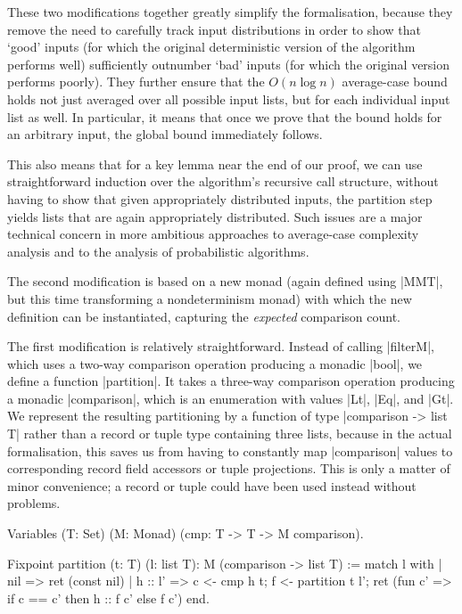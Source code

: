 \documentclass[runningheads]{llncs}
\begin{document}
These two modifications together greatly simplify the formalisation, because
they remove the need to carefully track input distributions in order to show
that `good' inputs (for which the original deterministic version of the
algorithm performs well) sufficiently outnumber `bad' inputs (for which the
original version performs poorly). They further ensure that the $O(n \log n)$
average-case bound holds not just averaged over all possible input lists, but
for each individual input list as well. In particular, it means that once we
prove that the bound holds for an arbitrary input, the global bound
immediately follows.

This also means that for a key lemma near the end of our proof, we can use
straightforward induction over the algorithm's recursive call structure,
without having to show that given appropriately distributed inputs, the
partition step yields lists that are again appropriately distributed. Such
issues are a major technical concern in more ambitious approaches to
average-case complexity analysis \cite[for example]{modularcalculus} and to
the analysis of probabilistic algorithms.

The second modification is based on a new monad (again defined using |MMT|,
but this time transforming a nondeterminism monad) with which the new
definition can be instantiated, capturing the \emph{expected} comparison
count.

The first modification is relatively straightforward. Instead of calling
|filterM|, which uses a two-way comparison operation producing a monadic |bool|, we
define a function |partition|. It takes a three-way comparison operation producing a monadic |comparison|, which is an enumeration with values |Lt|, |Eq|, and |Gt|. We represent the resulting partitioning by a function of type |comparison -> list T| rather than a record or tuple type containing three lists, because in the actual formalisation, this saves us from having to constantly map |comparison| values to corresponding record field accessors or tuple projections. This is only a matter of minor convenience; a record or tuple could have been used instead without problems.

\begin{code}
  Variables (T: Set) (M: Monad) (cmp: T -> T -> M comparison).

  Fixpoint partition (t: T) (l: list T): M (comparison -> list T) :=
    match l with
    | nil => ret (const nil)
    | h :: l' =>
        c <- cmp h t; f <- partition t l';
        ret (fun c' => if c == c' then h :: f c' else f c')
    end.
\end{code}
\end{document}
